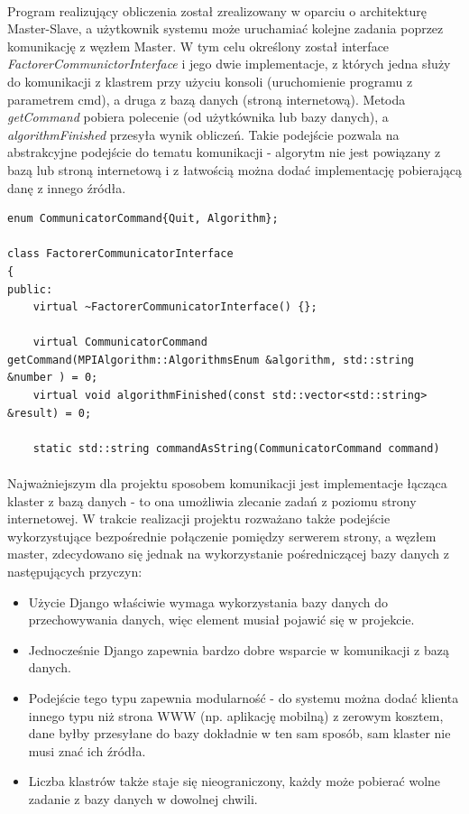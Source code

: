 \documentclass{article}
\begin{document}
\paragraph{}Program realizujący obliczenia został zrealizowany w oparciu o architekturę Master-Slave, a użytkownik systemu może uruchamiać kolejne zadania poprzez komunikację z węzłem Master. W tym celu określony został interface {\it FactorerCommunictorInterface} i jego dwie implementacje, z których jedna służy do komunikacji z klastrem przy użyciu konsoli (uruchomienie programu z parametrem cmd), a druga z bazą danych (stroną internetową). Metoda {\it getCommand} pobiera polecenie (od użytkównika lub bazy danych), a {\it algorithmFinished} przesyła wynik obliczeń. Takie podejście pozwala na abstrakcyjne podejście do tematu komunikacji - algorytm nie jest powiązany z bazą lub stroną internetową i z łatwością można dodać implementację pobierającą danę z innego źródła. 

\begin{lstlisting}[caption=Interface wykorzystany do komunikacji]
enum CommunicatorCommand{Quit, Algorithm};

class FactorerCommunicatorInterface
{
public:
    virtual ~FactorerCommunicatorInterface() {};

    virtual CommunicatorCommand getCommand(MPIAlgorithm::AlgorithmsEnum &algorithm, std::string &number ) = 0;
    virtual void algorithmFinished(const std::vector<std::string> &result) = 0;

    static std::string commandAsString(CommunicatorCommand command) 
\end{lstlisting}

\paragraph{}Najważniejszym dla projektu sposobem komunikacji jest implementacje łącząca klaster z bazą danych - to ona umożliwia zlecanie zadań z poziomu strony internetowej. W trakcie realizacji projektu rozważano także podejście wykorzystujące bezpośrednie połączenie pomiędzy serwerem strony, a węzłem master, zdecydowano się jednak na wykorzystanie pośredniczącej bazy danych z następujących przyczyn:
\begin{itemize}
\item Użycie Django właściwie wymaga wykorzystania bazy danych do przechowywania danych, więc element musiał pojawić się w projekcie.
\item Jednocześnie Django zapewnia bardzo dobre wsparcie w komunikacji z bazą danych.
\item Podejście tego typu zapewnia modularność - do systemu można dodać klienta innego typu niż strona WWW (np. aplikację mobilną) z zerowym kosztem, dane byłby przesyłane do bazy dokładnie w ten sam sposób, sam klaster nie musi znać ich źródła.
\item Liczba klastrów także staje się nieograniczony, każdy może pobierać wolne zadanie z bazy danych w dowolnej chwili.
\end{itemize}
\end{document}
